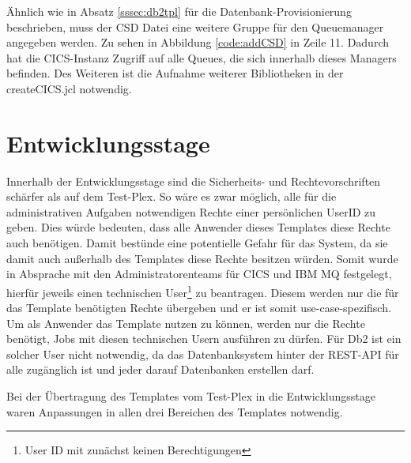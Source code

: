Ähnlich wie in Absatz \ref{sssec:db2tpl} für die Datenbank-Provisionierung beschrieben, muss der CSD Datei eine weitere Gruppe für den Queuemanager angegeben werden.
Zu sehen in Abbildung \ref{code:addCSD} in Zeile 11.
Dadurch hat die CICS-Instanz Zugriff auf alle Queues, die sich innerhalb dieses Managers befinden.
Des Weiteren ist die Aufnahme weiterer Bibliotheken in der \glqq createCICS.jcl\grqq{} notwendig.

\section{Entwicklungsstage}
Innerhalb der Entwicklungsstage sind die Sicherheits- und Rechtevorschriften schärfer als auf dem Test-Plex.
So wäre es zwar möglich, alle für die administrativen Aufgaben notwendigen Rechte einer persönlichen UserID zu geben.
Dies würde bedeuten, dass alle Anwender dieses Templates diese Rechte auch benötigen.
Damit bestünde eine potentielle Gefahr für das System, da sie damit auch außerhalb des Templates diese Rechte besitzen würden.
Somit wurde in Absprache mit den Administratorenteams für CICS und IBM MQ festgelegt, hierfür jeweils einen technischen User\footnote{User ID mit zunächst keinen Berechtigungen} zu beantragen.
Diesem werden nur die für das Template benötigten Rechte übergeben und er ist somit use-case-spezifisch.
Um als Anwender das Template nutzen zu können, werden nur die Rechte benötigt, Jobs mit diesen technischen Usern ausführen zu dürfen.
Für Db2 ist ein solcher User nicht notwendig, da das Datenbanksystem hinter der REST-API für alle zugänglich ist und jeder darauf Datenbanken erstellen darf.

Bei der Übertragung des Templates vom Test-Plex in die Entwicklungsstage waren Anpassungen in allen drei Bereichen des Templates notwendig.

